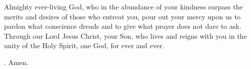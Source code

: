 \lettrine[lines=3]{A}{}lmighty ever-living God, who in the abundance of your kindness surpass the merits and desires of those who entreat you, pour out your mercy upon us to pardon what conscience dreads and to give what prayer does not dare to ask. Through our Lord Jesus Christ, your Son, who lives and reigns with you in the unity of the Holy Spirit, one God, for ever and ever. \par \Rbar. Amen.
